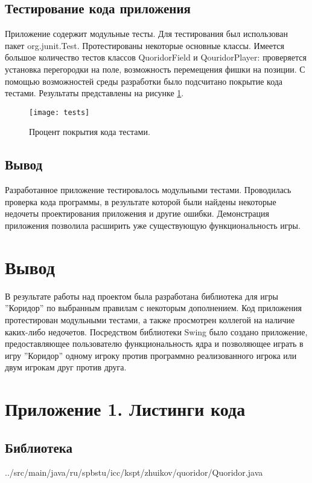 \documentclass[a4paper]{article}
\begin{document}
\subsection{Тестирование кода приложения}
Приложение содержит модульные тесты. Для тестирования был использован пакет org.junit.Test. Протестированы некоторые основные классы. Имеется большое количество тестов классов QuoridorField и QouridorPlayer: проверяется установка перегородки на поле, возможность перемещения фишки на позиции. С помощью возможностей среды разработки было подсчитано  покрытие кода тестами. Результаты представлены на рисунке \ref{pic:tests}. 

\begin{figure}[H]
	\begin{center}
		\texttt{[image: tests]}
		\caption{Процент покрытия кода тестами.}
		\label{pic:tests} %
	\end{center}
\end{figure}

\subsection{Вывод}
Разработанное приложение тестировалось модульными тестами. Проводилась проверка кода программы, в результате которой были найдены некоторые недочеты проектирования приложения и другие ошибки. Демонстрация приложения позволила расширить уже существующую функциональность игры. 

\section{Вывод}

В результате работы над проектом была разработана библиотека для игры ''Коридор'' по выбранным правилам с некоторым дополнением. Код приложения протестирован модульными тестами, а также просмотрен коллегой на наличие каких-либо недочетов. Посредством библиотеки Swing было создано приложение, предоставляющее пользователю функциональность ядра и позволяющее играть в игру ''Коридор'' одному игроку против программно реализованного игрока или двум игрокам друг против друга.
 
\newpage
\section{Приложение 1. Листинги кода}
\subsection{Библиотека}

{../src/main/java/ru/spbstu/icc/kspt/zhuikov/quoridor/Quoridor.java}
\newpage
\end{document}
